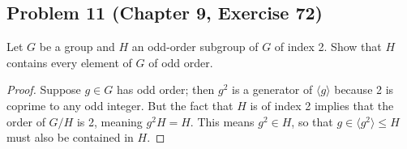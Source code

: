 \documentclass{article}
\begin{document}
\subsection*{Problem 11 (Chapter 9, Exercise 72)}
Let $G$ be a group and $H$ an odd-order subgroup of $G$ of index 2. Show that $H$ contains every element of $G$ of odd order.
\begin{proof}
Suppose $g \in G$ has odd order; then $g^2$ is a generator of $\langle g \rangle$ because 2 is coprime to any odd integer. But the fact that $H$ is of index 2 implies that the order of $G/H$ is 2, meaning $g^2H = H$. This means $g^2 \in H$, so that $g \in \langle g^2 \rangle \leq H$ must also be contained in $H$.
\end{proof}
\end{document}
